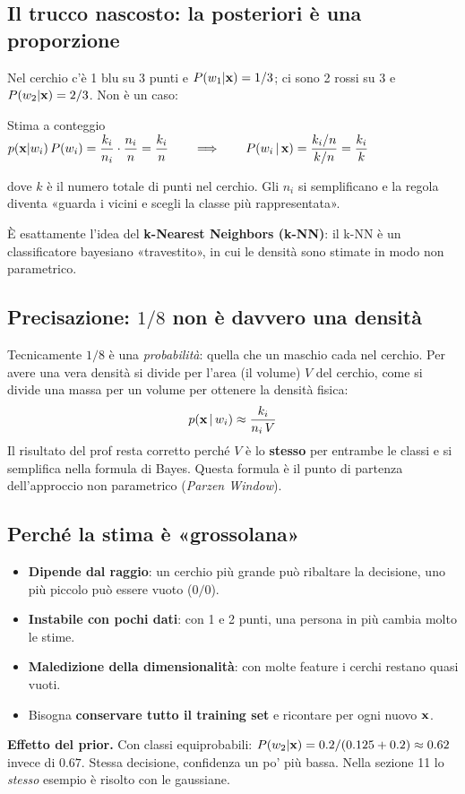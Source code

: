\subsection{Il trucco nascosto: la posteriori è una proporzione}
Nel cerchio c'è 1 blu su 3 punti e $P(w_1|\mathbf{x})=1/3$; ci sono 2 rossi su 3 e $P(w_2|\mathbf{x})=2/3$. Non è un caso:
\begin{formulat}{Stima a conteggio}
$\displaystyle p(\mathbf{x}|w_i)\,P(w_i)=\frac{k_i}{n_i}\cdot\frac{n_i}{n}=\frac{k_i}{n}
\qquad\Longrightarrow\qquad
P(w_i\,|\,\mathbf{x})=\frac{k_i/n}{k/n}=\frac{k_i}{k}$
\end{formulat}
dove $k$ è il numero totale di punti nel cerchio. Gli $n_i$ si semplificano e la regola diventa «guarda i vicini e scegli la classe più rappresentata».

\begin{mlbox}
È esattamente l'idea del \textbf{k-Nearest Neighbors (k-NN)}: il k-NN è un classificatore bayesiano «travestito», in cui le densità sono stimate in modo non parametrico.
\end{mlbox}

\subsection{Precisazione: $1/8$ non è davvero una densità}
\begin{tecnica}
Tecnicamente $1/8$ è una \emph{probabilità}: quella che un maschio cada nel cerchio. Per avere una vera densità si divide per l'area (il volume) $V$ del cerchio, come si divide una massa per un volume per ottenere la densità fisica:
\[
p(\mathbf{x}\,|\,w_i)\approx\frac{k_i}{n_i\,V}
\]
Il risultato del prof resta corretto perché $V$ è lo \textbf{stesso} per entrambe le classi e si semplifica nella formula di Bayes. Questa formula è il punto di partenza dell'approccio non parametrico (\emph{Parzen Window}).
\end{tecnica}

\subsection{Perché la stima è «grossolana»}
\begin{attenzione}
\begin{itemize}
  \item \textbf{Dipende dal raggio}: un cerchio più grande può ribaltare la decisione, uno più piccolo può essere vuoto ($0/0$).
  \item \textbf{Instabile con pochi dati}: con 1 e 2 punti, una persona in più cambia molto le stime.
  \item \textbf{Maledizione della dimensionalità}: con molte feature i cerchi restano quasi vuoti.
  \item Bisogna \textbf{conservare tutto il training set} e ricontare per ogni nuovo $\mathbf{x}$.
\end{itemize}
\end{attenzione}
\textbf{Effetto del prior.} Con classi equiprobabili: $P(w_2|\mathbf{x})=0.2/(0.125+0.2)\approx0.62$ invece di $0.67$. Stessa decisione, confidenza un po' più bassa. Nella sezione 11 lo \emph{stesso} esempio è risolto con le gaussiane.

